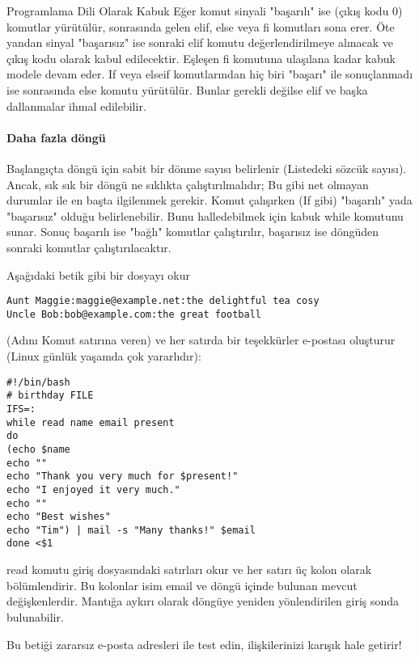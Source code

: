 \begin{section}{Programlama Dili Olarak Kabuk}
Eğer komut sinyali "başarılı" ise (çıkış kodu 0) komutlar yürütülür, sonrasında gelen elif, else veya fi komutları sona erer. Öte yandan sinyal "başarısız" ise sonraki elif komutu değerlendirilmeye alınacak ve çıkış kodu olarak kabul edilecektir. Eşleşen fi komutuna ulaşılana kadar kabuk modele devam eder. If veya elseif komutlarından hiç biri "başarı" ile sonuçlanmadı ise sonrasında else komutu yürütülür. Bunlar gerekli değilse elif ve başka dallanmalar ihmal edilebilir.

\paragraph{Daha fazla döngü}{Başlangıçta döngü için sabit bir dönme sayısı belirlenir (Listedeki sözcük sayısı). Ancak, sık sık bir döngü ne sıklıkta çalıştırılmalıdır; Bu gibi net olmayan durumlar ile en başta ilgilenmek gerekir. Komut çalışırken (If gibi) "başarılı" yada "başarısız" olduğu belirlenebilir. Bunu halledebilmek için kabuk while komutunu sunar. Sonuç başarılı ise "bağlı" komutlar çalıştırılır, başarısız ise döngüden sonraki komutlar çalıştırılacaktır.}

Aşağıdaki betik gibi bir dosyayı okur
\begin{verbatim}
Aunt Maggie:maggie@example.net:the delightful tea cosy
Uncle Bob:bob@example.com:the great football
\end{verbatim}

(Adını Komut satırına veren) ve her satırda bir teşekkürler e-postası oluşturur (Linux günlük yaşamda çok yararlıdır):
\begin{verbatim}
#!/bin/bash
# birthday FILE
IFS=:
while read name email present
do
(echo $name
echo ""
echo "Thank you very much for $present!"
echo "I enjoyed it very much."
echo ""
echo "Best wishes"
echo "Tim") | mail -s "Many thanks!" $email
done <$1
\end{verbatim}

read komutu giriş dosyasındaki satırları okur ve her satırı üç kolon olarak bölümlendirir. Bu kolonlar isim email ve döngü içinde bulunan mevcut değişkenlerdir. Mantığa aykırı olarak döngüye yeniden yönlendirilen giriş sonda bulunabilir. 

Bu betiği zararsız e-posta adresleri ile test edin, ilişkilerinizi karışık hale getirir!


\end{section}
